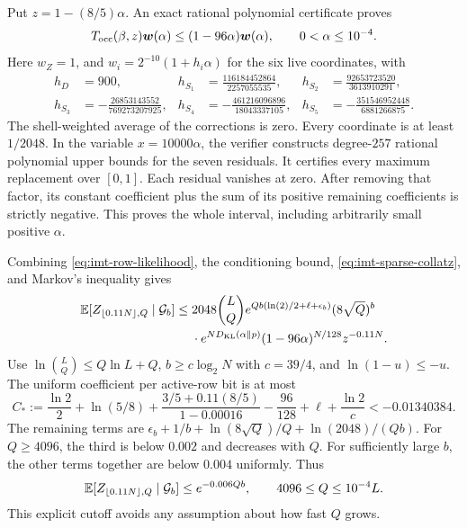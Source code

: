 Put $z=1-(8/5)\alpha$. An exact rational polynomial certificate proves
\begin{equation}
 T_{\rm occ}(\beta,z)\boldsymbol w(\alpha)
 \le (1-96\alpha)\boldsymbol w(\alpha),
 \qquad 0<\alpha\le10^{-4}.
 \label{eq:imt-sparse-collatz}
\end{equation}
Here $w_Z=1$, and $w_i=2^{-10}(1+h_i\alpha)$ for the six live coordinates,
with
\begin{align*}
 h_D&=900,& h_{S_1}&=\frac{116184452864}{2257055535},&
 h_{S_2}&=\frac{92653723520}{3613910291},\\
 h_{S_3}&=-\frac{26853143552}{769273207925},&
 h_{S_4}&=-\frac{461216096896}{18043337105},&
 h_{S_5}&=-\frac{351546952448}{6881266875}.
\end{align*}
The shell-weighted average of the corrections is zero. Every coordinate is
at least $1/2048$. In the variable $x=10000\alpha$, the verifier constructs
degree-$257$ rational polynomial upper bounds for the seven residuals.
It certifies every maximum replacement over $[0,1]$. Each residual vanishes
at zero. After removing that factor, its constant coefficient plus the sum
of its positive remaining coefficients is strictly negative. This proves
the whole interval, including arbitrarily small positive $\alpha$.

Combining \eqref{eq:imt-row-likelihood}, the conditioning bound,
\eqref{eq:imt-sparse-collatz}, and Markov's inequality gives
\begin{align}
 \mathbb E[Z_{\lfloor0.11N\rfloor,Q}\mid\mathcal G_b]
 \le{}&2048\binom LQ e^{Qb(\ln(2)/2+\ell+\epsilon_b)}(8\sqrt Q)^b
 \nonumber\\*
 &\cdot e^{ND_{\rm KL}(\alpha\Vert p)}
 (1-96\alpha)^{N/128}z^{-0.11N}.
 \label{eq:imt-uniform-sparse}
\end{align}
Use $\ln\binom LQ\le Q\ln L+Q$, $b\ge c\log_2N$ with $c=39/4$, and
$\ln(1-u)\le-u$. The uniform coefficient per active-row bit is at most
\[
 C_*:=\frac{\ln2}{2}+\ln(5/8)
 +\frac{3/5+0.11(8/5)}{1-0.00016}-\frac{96}{128}
 +\ell+\frac{\ln2}{c}<-0.01340384.
\]
The remaining terms are
$\epsilon_b+1/b+\ln(8\sqrt Q)/Q+\ln(2048)/(Qb)$.
For $Q\ge4096$, the third is below $0.002$ and decreases with $Q$.
For sufficiently large $b$, the other terms together are below $0.004$
uniformly. Thus
\begin{equation}
 \mathbb E[Z_{\lfloor0.11N\rfloor,Q}\mid\mathcal G_b]
 \le e^{-0.006Qb},\qquad 4096\le Q\le10^{-4}L.
 \label{eq:imt-sparse-final}
\end{equation}
This explicit cutoff avoids any assumption about how fast $Q$ grows.

